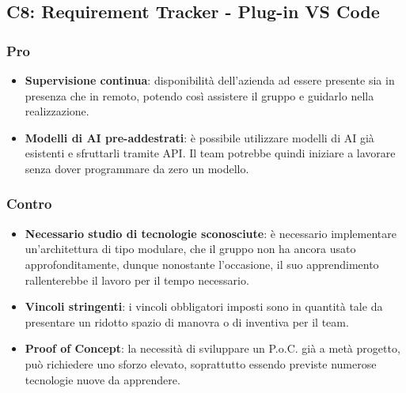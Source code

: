 \subsection{C8: Requirement Tracker - Plug-in VS Code}

\subsubsection{Pro}

\begin{itemize}
    \item \textbf{Supervisione continua}: disponibilità dell’azienda ad essere presente sia in presenza che in remoto, potendo così assistere il gruppo e guidarlo nella realizzazione.
    \item \textbf{Modelli di AI pre-addestrati}: è possibile utilizzare modelli di AI già esistenti e sfruttarli tramite API. Il team potrebbe quindi iniziare a lavorare senza dover programmare da zero un modello.
\end{itemize}

\subsubsection{Contro}

\begin{itemize}
    \item \textbf{Necessario studio di tecnologie sconosciute}: è necessario implementare un’architettura di tipo modulare, che il gruppo non ha ancora usato approfonditamente, dunque nonostante l’occasione, il suo apprendimento rallenterebbe il lavoro per il tempo necessario.
    \item \textbf{Vincoli stringenti}: i vincoli obbligatori imposti sono in quantità tale da presentare un ridotto spazio di manovra o di inventiva per il team.
    \item \textbf{Proof of Concept}: la necessità di sviluppare un P.o.C. già a metà progetto, può richiedere uno sforzo elevato, soprattutto essendo previste numerose tecnologie nuove da apprendere.
\end{itemize}